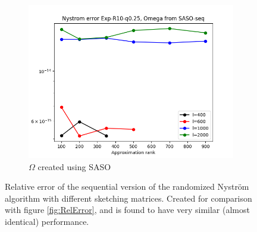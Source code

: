 \documentclass{article}
\theoremstyle{definition}
\begin{document}
\begin{appendices}
\begin{figure}
\begin{subfigure}[t]{0.35\textwidth}
    \includegraphics[width=\textwidth]{plots/relerror/relerror_Exp-R10-q0.25_SASO-seq.png}
    \caption{$\Omega$ created using SASO}
\end{subfigure}\hfill
\caption{Relative error of the sequential version of the randomized Nyström algorithm with different sketching matrices. Created for comparison with figure \ref{fig:RelError}, and is found to have very similar (almost identical) performance.}
\label{fig:SequentialRelError}
\end{figure}
\end{appendices}
\end{document}
